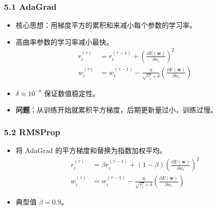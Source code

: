 \documentclass[t,aspectratio=169]{beamer} %
\begin{document}
\begin{frame}
    \frametitle{5.1 AdaGrad}
    \begin{itemize}
        \item 核心思想：用\alert{梯度平方的累积和}来减小每个参数的学习率。
        \item 高曲率参数的学习率减小最快。
        \begin{align}
        r_i^{(\tau)} &= r_i^{(\tau-1)} + \left(\frac{\partial E(\mathbf{w})}{\partial w_i}\right)^2 \tag{7.39} \\
        w_i^{(\tau)} &= w_i^{(\tau-1)} - \frac{\eta}{\sqrt{r_i^{\tau}} + \delta} \left(\frac{\partial E(\mathbf{w})}{\partial w_i}\right) \tag{7.40}
        \end{align}
        \item $\delta \approx 10^{-8}$ 保证数值稳定性。
        \item \textbf{问题}：从训练开始就累积平方梯度，后期更新量过小，训练过慢。
    \end{itemize}
\end{frame}

\begin{frame}
    \frametitle{5.2 RMSProp}
    \begin{itemize}
        \item 将 AdaGrad 的\alert{平方梯度和}替换为\alert{指数加权平均}。
        \begin{align}
        r_i^{(\tau)} &= \beta r_i^{(\tau-1)} + (1 - \beta) \left(\frac{\partial E(\mathbf{w})}{\partial w_i}\right)^2 \tag{7.41} \\
        w_i^{(\tau)} &= w_i^{(\tau-1)} - \frac{\eta}{\sqrt{r_i^{\tau}} + \delta} \left(\frac{\partial E(\mathbf{w})}{\partial w_i}\right) \tag{7.42}
        \end{align}
        \item 典型值 $\beta = 0.9$。
    \end{itemize}
\end{frame}
\end{document}
